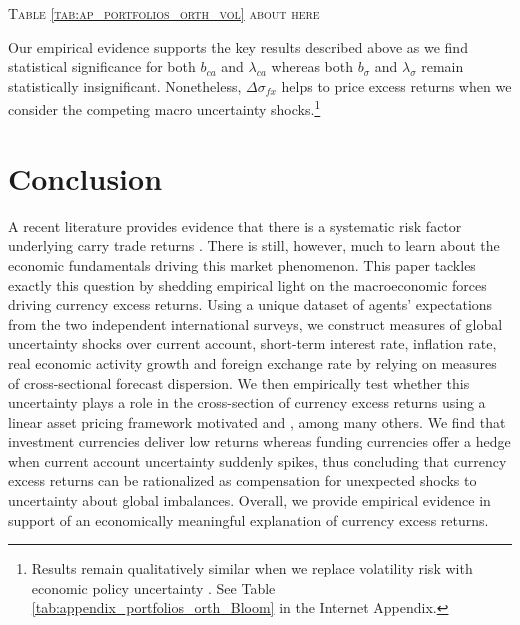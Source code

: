 \begin{center}
\textsc{Table \ref{tab:ap_portfolios_orth_vol} about here}
\end{center}
Our empirical evidence supports the key results described above as we find statistical significance for both $b_{ca}$ and $\lambda_{ca}$ whereas both $b_{\sigma}$ and $\lambda_{\sigma}$ remain statistically insignificant. Nonetheless, $\Delta \sigma_{fx}$ helps to price excess returns when we consider the competing macro uncertainty shocks.\footnote{Results remain qualitatively similar when we replace volatility risk with economic policy uncertainty \citep[e.g.,][]{Baker/Bloom/Davis:2013}. See Table \ref{tab:appendix_portfolios_orth_Bloom} in the Internet Appendix.}


\section{Conclusion}\label{sec:conclusion_UNC_CAR}
A recent literature provides evidence that there is a systematic risk factor underlying carry trade returns \citep{lustig_etal2011,menkhoff_etal2012}. There is still, however, much to learn about the economic fundamentals driving this market phenomenon. This paper tackles exactly this question by shedding empirical light on the macroeconomic forces driving currency excess returns. Using a unique dataset of agents' expectations from the two independent international surveys, we construct measures of global uncertainty shocks over current account, short-term interest rate, inflation rate, real economic activity growth and foreign exchange rate by relying on measures of cross-sectional forecast dispersion. We then empirically test whether this uncertainty  plays a role in the cross-section of currency excess returns using a linear asset pricing framework motivated \citet{merton1973} and \citet{anderson_etal2009}, among many others. We find that investment currencies deliver low returns whereas funding currencies offer a hedge when current account uncertainty suddenly spikes, thus concluding that currency excess returns can be rationalized as compensation for unexpected shocks to uncertainty about global imbalances. Overall, we provide empirical evidence in support of an economically meaningful explanation of currency excess returns. %

